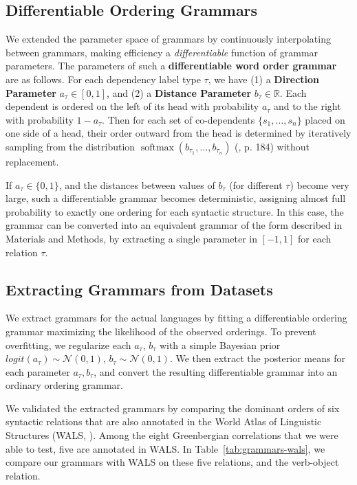 \documentclass[10pt,twoside,lineno]{article}
\newcommand{\key}[1]{\textbf{#1}}
\begin{document}
\subsection{Differentiable Ordering Grammars}\label{sec:diff-gramm}

We extended the parameter space of grammars by continuously interpolating between grammars, making efficiency a \emph{differentiable} function of grammar parameters.
The parameters of such a \key{differentiable word order grammar} are as follows. 
For each dependency label type $\tau$, we have (1) a \key{Direction Parameter} $a_\tau \in [0,1]$, and (2) a \key{Distance Parameter} $b_\tau \in \mathbb{R}$. 
Each dependent is ordered on the left of its head with probability $a_\tau$ and to the right with probability $1-a_\tau$. 
Then for each set of co-dependents $\{s_1, \dots , s_n\}$ placed on one side of a head, their order outward from the head is determined by iteratively sampling from the distribution $\operatorname{softmax}(b_{\tau_1}, \dots, b_{\tau_n})$ (\cite{goodfellow2016deep}, p. 184) without replacement. 

If $a_\tau \in \{0, 1\}$, and the distances between values of $b_\tau$ (for different $\tau$) become very large, such a differentiable grammar becomes deterministic, assigning almost full probability to exactly one ordering for each syntactic structure.
In this case, the grammar can be converted into an equivalent grammar of the form described in Materials and Methods, by extracting a single parameter in $[-1, 1]$ for each relation $\tau$.


\subsection{Extracting Grammars from Datasets}
We extract grammars for the actual languages by fitting a differentiable ordering grammar maximizing the likelihood of the observed orderings.
To prevent overfitting, we regularize each $a_\tau$, $b_\tau$ with a simple Bayesian prior $logit(a_\tau) \sim \mathcal{N}(0,1)$, $b_\tau \sim \mathcal{N}(0,1)$.
We then extract the posterior means for each parameter $a_\tau, b_\tau$, and convert the resulting differentiable grammar into an ordinary ordering grammar.



We validated the extracted grammars by comparing the dominant orders of six syntactic relations that are also annotated in the World Atlas of Linguistic Structures (WALS, \cite{haspelmath2005world}).
Among the eight Greenbergian correlations that we were able to test, five are annotated in WALS.
In Table~\ref{tab:grammars-wals}, we compare our grammars with WALS on these five relations, and the verb-object relation.
\end{document}
